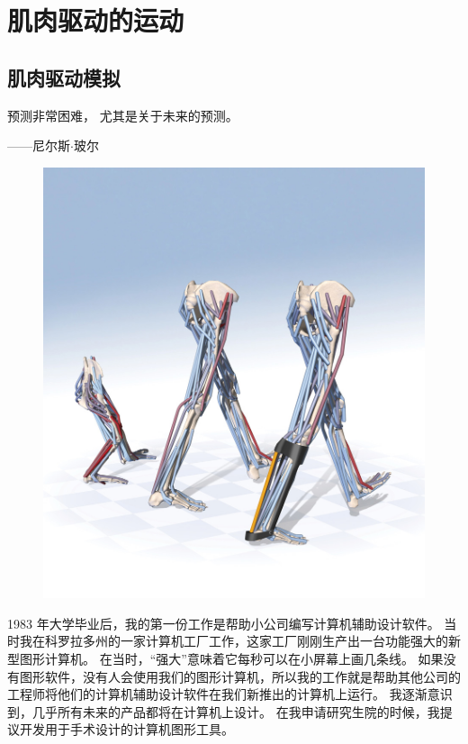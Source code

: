 \part{肌肉驱动的运动}



\chapter{肌肉驱动模拟} \label{chap:chap10}


预测非常困难，
尤其是关于未来的预测。
\begin{flushright}
	——尼尔斯$ \cdot $玻尔
\end{flushright}


\begin{figure}[!htb]
	\centering
	\includegraphics[width=0.9\linewidth]{chap10/10_0}
	\caption*{ \label{fig:10_0}}
\end{figure}

1983 年大学毕业后，我的第一份工作是帮助小公司编写计算机辅助设计软件。
当时我在科罗拉多州的一家计算机工厂工作，这家工厂刚刚生产出一台功能强大的新型图形计算机。
在当时，“强大”意味着它每秒可以在小屏幕上画几条线。
如果没有图形软件，没有人会使用我们的图形计算机，所以我的工作就是帮助其他公司的工程师将他们的计算机辅助设计软件在我们新推出的计算机上运行。
我逐渐意识到，几乎所有未来的产品都将在计算机上设计。
在我申请研究生院的时候，我提议开发用于手术设计的计算机图形工具。


